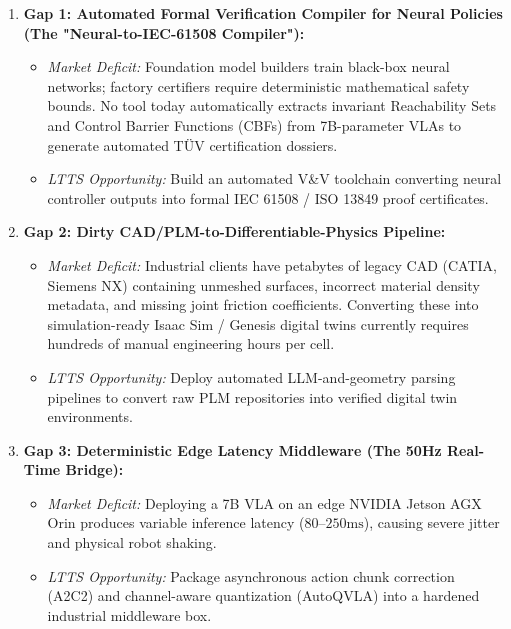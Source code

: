 \documentclass[11pt,a4paper]{article}
\begin{document}
\begin{enumerate}
    \item \textbf{Gap 1: Automated Formal Verification Compiler for Neural Policies (The "Neural-to-IEC-61508 Compiler"):}
    \begin{itemize}
        \item \textit{Market Deficit:} Foundation model builders train black-box neural networks; factory certifiers require deterministic mathematical safety bounds. No tool today automatically extracts invariant Reachability Sets and Control Barrier Functions (CBFs) from 7B-parameter VLAs to generate automated TÜV certification dossiers.
        \item \textit{LTTS Opportunity:} Build an automated V\&V toolchain converting neural controller outputs into formal IEC 61508 / ISO 13849 proof certificates.
    \end{itemize}

    \item \textbf{Gap 2: Dirty CAD/PLM-to-Differentiable-Physics Pipeline:}
    \begin{itemize}
        \item \textit{Market Deficit:} Industrial clients have petabytes of legacy CAD (CATIA, Siemens NX) containing unmeshed surfaces, incorrect material density metadata, and missing joint friction coefficients. Converting these into simulation-ready Isaac Sim / Genesis digital twins currently requires hundreds of manual engineering hours per cell.
        \item \textit{LTTS Opportunity:} Deploy automated LLM-and-geometry parsing pipelines to convert raw PLM repositories into verified digital twin environments.
    \end{itemize}

    \item \textbf{Gap 3: Deterministic Edge Latency Middleware (The 50Hz Real-Time Bridge):}
    \begin{itemize}
        \item \textit{Market Deficit:} Deploying a 7B VLA on an edge NVIDIA Jetson AGX Orin produces variable inference latency ($80\text{--}250\text{ms}$), causing severe jitter and physical robot shaking.
        \item \textit{LTTS Opportunity:} Package asynchronous action chunk correction (A2C2) and channel-aware quantization (AutoQVLA) into a hardened industrial middleware box.
    \end{itemize}
\end{enumerate}
\end{document}
